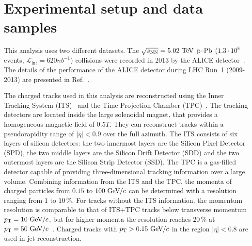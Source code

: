 %
%

\section{Experimental setup and data samples}
\label{sec:experimentaldetails}
This analysis uses two different datasets. The $\sqrt{s_{\mathrm{NN}}} = 5.02~\mathrm{TeV}$ $\mbox{p--Pb}$ ($1.3 \cdot 10^{8}$ events, $\mathcal{L}_{\mathrm{int}} = \unit{620}{nb^{-1}}$) collisions were recorded in 2013 by the ALICE detector~\cite{aliceDetector}. The details of the performance of the ALICE detector during LHC Run~1 (2009-2013) are presented in Ref.~\cite{alicePerformance}.

The charged tracks used in this analysis are reconstructed using the Inner Tracking System (ITS)~\cite{aliceITS} and the Time Projection Chamber (TPC)~\cite{aliceTPC}. The tracking detectors are located inside the large solenoidal magnet, that provides a homogeneous magnetic field of $\unit{0.5}{T}$. They can reconstruct tracks within a pseudorapidity range of $|\eta| < 0.9$ over the full azimuth. The ITS consists of six layers of silicon detectors: the two innermost layers are the Silicon Pixel Detector (SPD), the two middle layers are the Silicon Drift Detector (SDD) and the two outermost layers are the Silicon Strip Detector (SSD). The TPC is a gas-filled detector capable of providing three-dimensional tracking information over a large volume. Combining information from the ITS and the TPC, the momenta of charged particles from $0.15$ to $100~\mathrm{GeV}\kern-0.05em/\kern-0.02em c$ can be determined with a resolution ranging from $1$ to $10\,\%$. For tracks without the ITS information, the momentum resolution is comparable to that of ITS+TPC tracks below transverse momentum $p_{\rm T} = 10~\mathrm{GeV}\kern-0.05em/\kern-0.02em c$, but for higher momenta the resolution reaches $20\,\%$ at $p_{\rm T} = 50~\mathrm{GeV}\kern-0.05em/\kern-0.02em c$~\cite{alicePerformance,aliceBackgroundFluctuation}. Charged tracks with  $p_{\rm T} > 0.15~\mathrm{GeV}\kern-0.05em/\kern-0.02em c$ in the region $|\eta| < 0.8$ are used in jet reconstruction.

